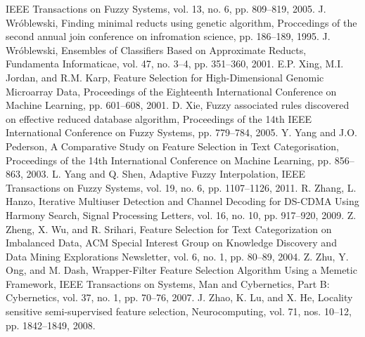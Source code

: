 IEEE Transactions on Fuzzy Systems,
vol. 13, no. 6, pp. 809--819,
2005.
J. Wr\'{o}blewski,
Finding minimal reducts using genetic algorithm,
Proccedings of the second annual join conference on infromation science,
pp. 186--189,
1995.
J. Wr\'{o}blewski,
Ensembles of Classifiers Based on Approximate Reducts,
Fundamenta Informaticae,
vol. 47, no. 3--4, pp. 351--360,
2001.
E.P. Xing, M.I. Jordan, and R.M. Karp,
Feature Selection for High-Dimensional Genomic Microarray Data,
Proceedings of the Eighteenth International Conference on Machine Learning,
pp. 601--608,
2001.
D. Xie,
Fuzzy associated rules discovered on effective reduced database algorithm,
Proceedings of the 14th IEEE International Conference on Fuzzy Systems,
pp. 779--784,
2005.
Y. Yang and J.O. Pederson,
A Comparative Study on Feature Selection in Text Categorisation,
Proceedings of the 14th International Conference on Machine Learning,
pp. 856--863,
2003.
L. Yang and Q. Shen,
Adaptive Fuzzy Interpolation,
IEEE Transactions on Fuzzy Systems,
vol. 19, no. 6, pp. 1107--1126,
2011.
R. Zhang, L. Hanzo,
Iterative Multiuser Detection and Channel Decoding for DS-CDMA Using Harmony Search,
Signal Processing Letters,
vol. 16, no. 10, pp. 917--920,
2009.
Z. Zheng, X. Wu, and R. Srihari,
Feature Selection for Text Categorization on Imbalanced Data,
ACM Special Interest Group on Knowledge Discovery and Data Mining Explorations Newsletter,
vol. 6, no. 1, pp. 80--89,
2004.
Z. Zhu, Y. Ong, and M. Dash,
Wrapper-Filter Feature Selection Algorithm Using a Memetic Framework,
IEEE Transactions on Systems, Man and Cybernetics, Part B: Cybernetics,
vol. 37, no. 1, pp. 70--76,
2007.
J. Zhao, K. Lu, and X. He,
Locality sensitive semi-supervised feature selection,
Neurocomputing,
vol. 71, nos. 10--12, pp. 1842--1849,
2008.